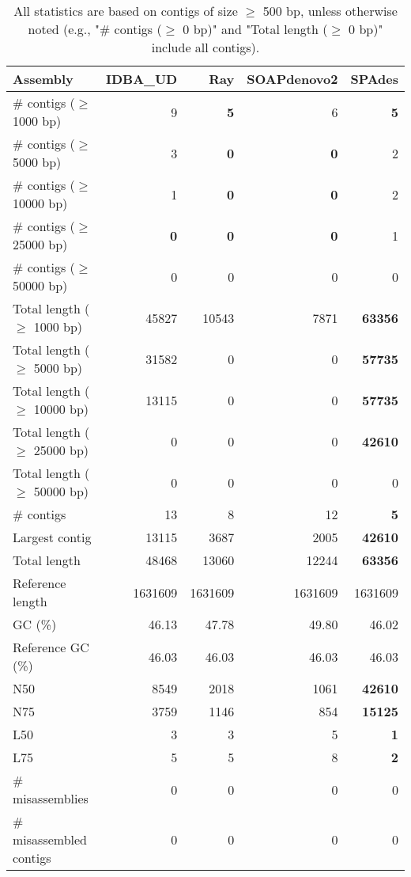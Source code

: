 \documentclass[12pt,a4paper]{article}
\begin{document}
\begin{table}[ht]
\begin{center}
\caption{All statistics are based on contigs of size $\geq$ 500 bp, unless otherwise noted (e.g., "\# contigs ($\geq$ 0 bp)" and "Total length ($\geq$ 0 bp)" include all contigs).}
\begin{tabular}{|l*{4}{|r}|}
\hline
Assembly & IDBA\_UD & Ray & SOAPdenovo2 & SPAdes \\ \hline
\# contigs ($\geq$ 1000 bp) & 9 & {\bf 5} & 6 & {\bf 5} \\ \hline
\# contigs ($\geq$ 5000 bp) & 3 & {\bf 0} & {\bf 0} & 2 \\ \hline
\# contigs ($\geq$ 10000 bp) & 1 & {\bf 0} & {\bf 0} & 2 \\ \hline
\# contigs ($\geq$ 25000 bp) & {\bf 0} & {\bf 0} & {\bf 0} & 1 \\ \hline
\# contigs ($\geq$ 50000 bp) & 0 & 0 & 0 & 0 \\ \hline
Total length ($\geq$ 1000 bp) & 45827 & 10543 & 7871 & {\bf 63356} \\ \hline
Total length ($\geq$ 5000 bp) & 31582 & 0 & 0 & {\bf 57735} \\ \hline
Total length ($\geq$ 10000 bp) & 13115 & 0 & 0 & {\bf 57735} \\ \hline
Total length ($\geq$ 25000 bp) & 0 & 0 & 0 & {\bf 42610} \\ \hline
Total length ($\geq$ 50000 bp) & 0 & 0 & 0 & 0 \\ \hline
\# contigs & 13 & 8 & 12 & {\bf 5} \\ \hline
Largest contig & 13115 & 3687 & 2005 & {\bf 42610} \\ \hline
Total length & 48468 & 13060 & 12244 & {\bf 63356} \\ \hline
Reference length & 1631609 & 1631609 & 1631609 & 1631609 \\ \hline
GC (\%) & 46.13 & 47.78 & 49.80 & 46.02 \\ \hline
Reference GC (\%) & 46.03 & 46.03 & 46.03 & 46.03 \\ \hline
N50 & 8549 & 2018 & 1061 & {\bf 42610} \\ \hline
N75 & 3759 & 1146 & 854 & {\bf 15125} \\ \hline
L50 & 3 & 3 & 5 & {\bf 1} \\ \hline
L75 & 5 & 5 & 8 & {\bf 2} \\ \hline
\# misassemblies & 0 & 0 & 0 & 0 \\ \hline
\# misassembled contigs & 0 & 0 & 0 & 0 \\ \hline

\end{tabular}
\end{center}
\end{table}
\end{document}
